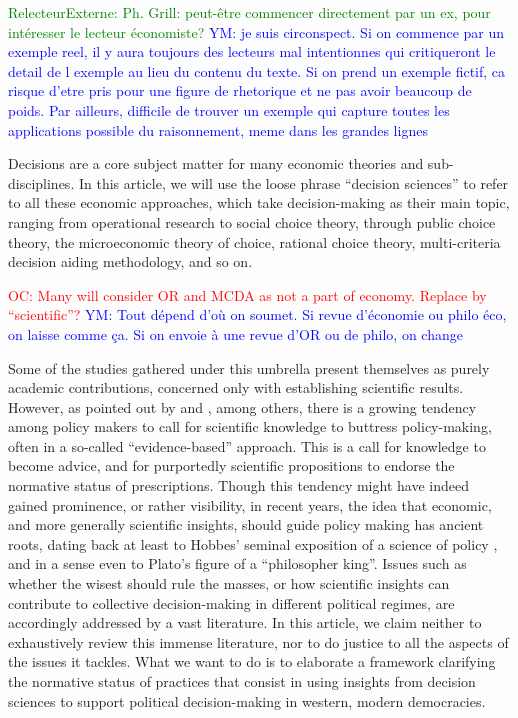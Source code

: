 \documentclass[preprint,11pt]{elsarticle}
\newcommand{\commentYM}[1]{\textcolor{blue}{YM: #1}}
\newcommand{\commentOC}[1]{\textcolor{red}{OC: #1}}
\newcommand{\commentE}[1]{\textcolor{green}{RelecteurExterne: #1}}
\begin{document}
\commentE{Ph. Grill: peut-être commencer directement par un ex, pour intéresser le lecteur économiste?}
\commentYM{je suis circonspect. Si on commence par un exemple reel, il y aura toujours des lecteurs mal intentionnes qui critiqueront le detail de l exemple au lieu du contenu du texte. Si on prend un exemple fictif, ca risque d'etre pris pour une figure de rhetorique et ne pas avoir beaucoup de poids. Par ailleurs, difficile de trouver un exemple qui capture toutes les applications possible du raisonnement, meme dans les grandes lignes}

\noindent Decisions are a core subject matter for many economic theories and sub-disciplines. In this article, we will use the loose phrase ``decision sciences'' to refer to all these economic approaches, which take decision-making as their main topic, ranging from operational research to social choice theory, through public choice theory, the microeconomic theory of choice, rational choice theory, multi-criteria decision aiding methodology, and so on.

\commentOC{Many will consider OR and MCDA as not a part of economy. Replace by “scientific”?}
\commentYM{Tout dépend d'où on soumet. Si revue d'économie ou philo éco, on laisse comme ça. Si on envoie à une revue d'OR ou de philo, on change}

Some of the studies gathered under this umbrella present themselves as purely academic contributions, concerned only with establishing scientific results. However, as pointed out by \cite{tsoukias_policy_2013} and \cite{marchi_evidence-based_2016}, among others, there is a growing tendency among policy makers to call for scientific knowledge to buttress policy-making, often in a so-called ``evidence-based'' approach. This is a call for knowledge to become advice, and for purportedly scientific propositions to endorse the normative status of prescriptions. Though this tendency might have indeed gained prominence, or rather visibility, in recent years, the idea that economic, and more generally scientific insights, should guide policy making has ancient roots, dating back at least to Hobbes’ seminal exposition of a science of policy \citep{skinner_reason_1996}, and in a sense even to Plato's figure of a ``philosopher king''. Issues such as whether the wisest should rule the masses, or how scientific insights can contribute to collective decision-making in different political regimes, are accordingly addressed by a vast literature. In this article, we claim neither to exhaustively review this immense literature, nor to do justice to all the aspects of the issues it tackles. What we want to do is to elaborate a framework clarifying the normative status of practices that consist in using insights from decision sciences to support political decision-making in western, modern democracies.
\end{document}
